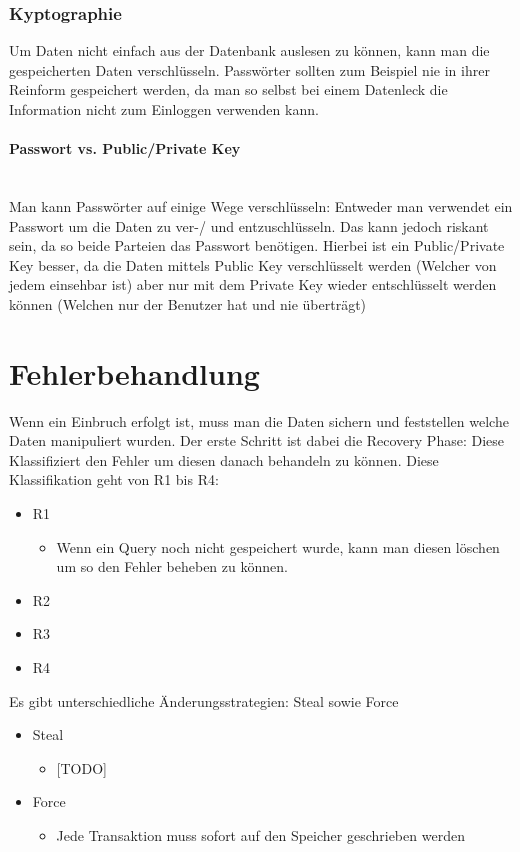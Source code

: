 \documentclass{article}
\newcommand{\paragraphlb}[1]{\paragraph{#1}\mbox{}\\}
\begin{document}
	\subsubsection{Kyptographie}
	Um Daten nicht einfach aus der Datenbank auslesen zu können, kann man die gespeicherten Daten verschlüsseln. Passwörter sollten zum Beispiel nie in ihrer Reinform gespeichert werden, da man so selbst bei einem Datenleck die Information nicht zum Einloggen verwenden kann.
	\paragraphlb{Passwort vs. Public/Private Key}
	Man kann Passwörter auf einige Wege verschlüsseln: Entweder man verwendet ein Passwort um die Daten zu ver-/ und entzuschlüsseln. Das kann jedoch riskant sein, da so beide Parteien das Passwort benötigen. Hierbei ist ein Public/Private Key besser, da die Daten mittels Public Key verschlüsselt werden (Welcher von jedem einsehbar ist) aber nur mit dem Private Key wieder entschlüsselt werden können (Welchen nur der Benutzer hat und nie überträgt)
	\section{Fehlerbehandlung}
	Wenn ein Einbruch erfolgt ist, muss man die Daten sichern und feststellen welche Daten manipuliert wurden. Der erste Schritt ist dabei die Recovery Phase: Diese Klassifiziert den Fehler um diesen danach behandeln zu können. Diese Klassifikation geht von R1 bis R4:
	\begin{itemize}
		\item{R1}
		\begin{itemize}
			\item{Wenn ein Query noch nicht gespeichert wurde, kann man diesen löschen um so den Fehler beheben zu können.}
		\end{itemize}
		\item{R2}
		\item{R3}
		\item{R4}
	\end{itemize}
	Es gibt unterschiedliche Änderungsstrategien: Steal sowie Force
	
	\begin{itemize}
		\item{Steal}
		\begin{itemize}
			\item{[TODO]}
		\end{itemize}
		\item{Force}
		\begin{itemize}
			\item{Jede Transaktion muss sofort auf den Speicher geschrieben werden}
		\end{itemize}
	\end{itemize}
\end{document}
